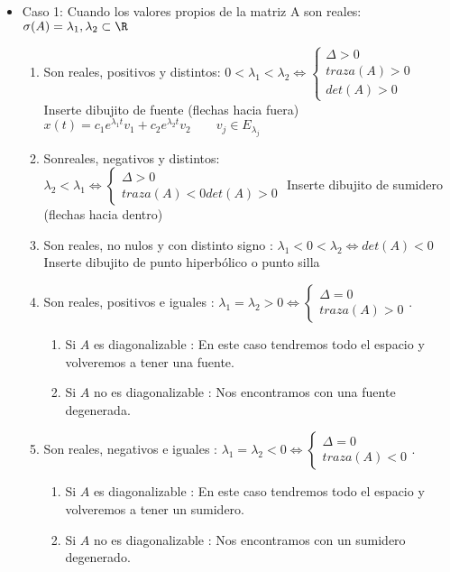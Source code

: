 {\begin{itemize}
\item Caso 1: Cuando los valores propios de la matriz A son reales: $\sigma(A)={\lambda_1,\lambda_2}\subset \R$
\begin{enumerate}
\item Son reales, positivos y distintos: $0<\lambda_1<\lambda_2 \Leftrightarrow \left\{ \begin{array}{rl}\Delta > 0 \\ traza(A)>0 \\ det(A) > 0 \end{array}$
Inserte dibujito de fuente (flechas hacia fuera)
$x(t)=c_1 e^{\lambda_1t}v_1+c_2 e^{\lambda_2t}v_2 \qquad v_j \in E_{\lambda_j}$
\item Sonreales, negativos y distintos: $\lambda_2 < \lambda_1 \Leftrightarrow \left\{ \begin{array}{rl}\Delta > 0 \\ traza(A) < 0 det(A)>0\end{array}$
Inserte dibujito de sumidero (flechas hacia dentro)
\item Son reales, no nulos y con distinto signo : $\lambda_1 < 0 < \lambda_2 \Leftrightarrow det(A)<0$
Inserte dibujito de punto hiperbólico o punto silla
\item Son reales, positivos e iguales : $\lambda_1=\lambda_2>0 \Leftrightarrow \left\{ \begin{array}{rl} \Delta = 0 \\ traza(A)>0\end{array}$.
\begin{enumerate}
\item Si $A$ es diagonalizable : En este caso tendremos todo el espacio y volveremos a tener una fuente.
\item Si $A$ no es diagonalizable : Nos encontramos con una fuente degenerada.
\end{enumerate}
\item Son reales, negativos e iguales : $\lambda_1=\lambda_2<0 \Leftrightarrow \left\{ \begin{array}{rl} \Delta = 0 \\ traza(A)<0\end{array}$.
\begin{enumerate}
\item Si $A$ es diagonalizable : En este caso tendremos todo el espacio y volveremos a tener un sumidero.
\item Si $A$ no es diagonalizable : Nos encontramos con un sumidero degenerado.

\end{enumerate}
\end{enumerate}
\end{itemize}}
